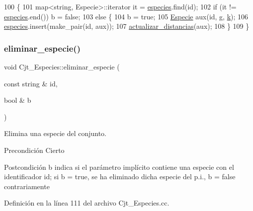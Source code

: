\begin{DoxyCode}
100                                                                            \{
101   map<string, Especie>::iterator it = \hyperlink{class_cjt___especies_a8f319699bd2e8a42b85ec47b67c17563}{especies}.find(\textcolor{keywordtype}{id});
102   \textcolor{keywordflow}{if} (it != \hyperlink{class_cjt___especies_a8f319699bd2e8a42b85ec47b67c17563}{especies}.end()) b = \textcolor{keyword}{false};
103   \textcolor{keywordflow}{else} \{
104     b = \textcolor{keyword}{true};
105     \hyperlink{class_especie}{Especie} aux(\textcolor{keywordtype}{id}, g, \hyperlink{class_cjt___especies_a4586fb4724b7af4b7f00bb0c0bdd6a17}{k});
106     \hyperlink{class_cjt___especies_a8f319699bd2e8a42b85ec47b67c17563}{especies}.insert(make\_pair(\textcolor{keywordtype}{id}, aux));
107     \hyperlink{class_cjt___especies_a74dc0d7118d70ee6e24e7dd84d49e688}{actualizar\_distancias}(aux);
108   \}
109 \}
\end{DoxyCode}
\mbox{\label{class_cjt___especies_a9c480bd8e1d39656ab14abfd3a2325fb}} 
\subsubsection{\texorpdfstring{eliminar\+\_\+especie()}{eliminar\_especie()}}
{\footnotesize\ttfamily void Cjt\+\_\+\+Especies\+::eliminar\+\_\+especie (\begin{DoxyParamCaption}\item[{const string \&}]{id,  }\item[{bool \&}]{b }\end{DoxyParamCaption})}



Elimina una especie del conjunto. 

\begin{DoxyPrecond}{Precondición}
Cierto 
\end{DoxyPrecond}
\begin{DoxyPostcond}{Postcondición}
b indica si el parámetro implícito contiene una especie con el identificador id; si b = true, se ha eliminado dicha especie del p.\+i., b = false contrariamente 
\end{DoxyPostcond}


Definición en la línea 111 del archivo Cjt\+\_\+\+Especies.\+cc.



